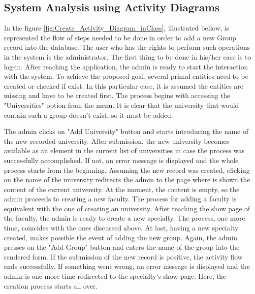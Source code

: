 \subsection{System Analysis using Activity Diagrams}
In the figure \autoref{fig:Create_Activity_Diagram_inClass}, illustrated bellow, is represented the flow of steps needed to be done in order to add a new Group record into the database. The user who has the rights to perform such operations in the system is the administrator. The first thing to be done in his/her case is to log-in. After reaching the application, the admin is ready to start the interaction with the system. To achieve the proposed goal, several primal entities need to be created or checked if exist. In this particular case, it is assumed the entities are missing and have to be created first. The process begins with accessing the "Universities" option from the menu. It is clear that the university that would contain such a group doesn't exist, so it must be added. 

The admin clicks on "Add University" button and starts introducing the name of the new recorded university. After submission, the new university becomes available as an element in the current list of universities in case the process was successfully accomplished. If not, an error message is displayed and the whole process starts from the beginning. Assuming the new record was created, clicking on the name of the university redirects the admin to the page where is shown the content of the current university. At the moment, the content is empty, so the admin proceeds to creating a new faculty. The process for adding a faculty is equivalent with the one of creating an university. After reaching the show page of the faculty, the admin is ready to create a new specialty. The process, one more time, coincides with the ones discussed above. At last, having a new specialty created, makes possible the event of adding the new group. Again, the admin presses on the "Add Group" button and enters the name of the group into the rendered form. If the submission of the new record is positive, the activity flow ends successfully. If something went wrong, an error message is displayed and the admin is one more time redirected to the specialty's show page. Here, the creation process starts all over.

